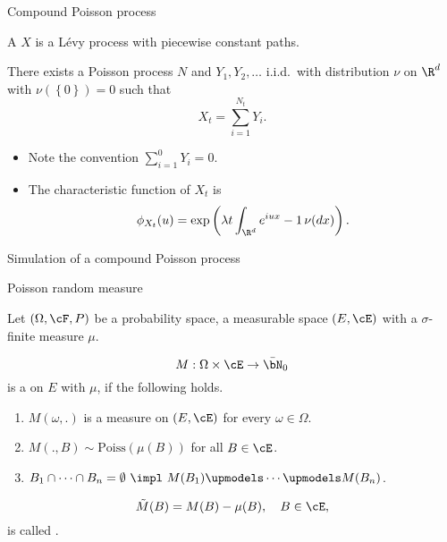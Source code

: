 \begin{frame}
    {Compound Poisson process}

    \begin{definition}
        A  $X$ is a L\'evy process with piecewise
        constant paths. 
    \end{definition}

    There exists a Poisson process $N$ and $Y_1, Y_2, \ldots$ i.i.d.\ with distribution 
    $\nu$ on $\R^d$ with $\nu(\left\{ 0 \right\})=0$ such that
    \begin{equation*}
        X_t = \sum_{i=1}^{N_t} Y_i.
    \end{equation*}

    \begin{itemize}
        \item Note the convention $\sum_{i=1}^{0} Y_i = 0$. 
        \item The characteristic function of $X_t$ is
            \begin{equation*}
                \phi_{X_t}(u) = \exp \left( \lambda t \int_{\R^d} e^{iux}-1 \, \nu(dx)\right).
            \end{equation*}
    \end{itemize}
\end{frame}

\begin{frame}
    {Simulation of a compound Poisson process}
    
\end{frame}


\begin{frame}
    {Poisson random measure}
    
    Let $\left( \Omega, \cF, P \right)$ be a probability space, a measurable 
    space $(E,\cE)$ with a $\sigma$-finite measure $\mu$. 

    \begin{equation*}
        M: \Omega \times \cE \to \bar\bN_0
    \end{equation*}
    is a  on $E$ with  $\mu$, if the
    following holds.
    \begin{enumerate}
        \item $M(\omega, .)$ is a measure on $(E,\cE)$ for every $\omega\in\Omega$. 
        \item $M(., B) \sim \text{Poiss}(\mu(B))$ for all $B\in\cE$. 
        \item $B_1 \cap \cdots \cap B_n = \emptyset 
            \ \impl \  M(B_1) \upmodels \cdots \upmodels M(B_n)$.
    \end{enumerate}

    \begin{equation*}
        \tilde M(B) = M(B) - \mu(B), \quad B\in\cE,
    \end{equation*}
    is called .
\end{frame}


